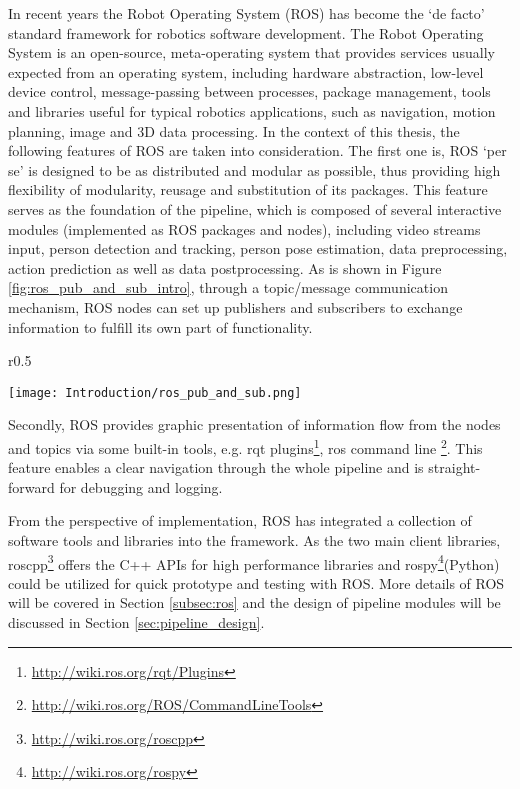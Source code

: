 In recent years the Robot Operating System (ROS) \cite{quigley2009ros} has become the ‘de facto’ standard framework for robotics software development. The Robot Operating System is an open-source, meta-operating system that provides services usually expected from an operating system, including hardware abstraction, low-level device control, message-passing between processes, package management, tools and libraries useful for typical robotics applications, such as navigation, motion planning, image and 3D data processing. In the context of this thesis, the following features of ROS are taken into consideration. The first one is, ROS ‘per se’ is designed to be as distributed and modular as possible, thus providing high flexibility of modularity, reusage and substitution of its packages. This feature serves as the foundation of the pipeline, which is composed of several interactive modules (implemented as ROS packages and nodes), including video streams input, person detection and tracking, person pose estimation, data preprocessing, action prediction as well as data postprocessing. As is shown in Figure \ref{fig:ros_pub_and_sub_intro}, through a topic/message communication mechanism, ROS nodes can set up publishers and subscribers to exchange information to fulfill its own part of functionality. 

\begin{wrapfigure}{r}{0.5\textwidth}
  \begin{center}
    \texttt{[image: Introduction/ros\_pub\_and\_sub.png]}
  \end{center}
  \caption{ROS Publisher and Subscriber}
  \label{fig:ros_pub_and_sub_intro}
\end{wrapfigure}

Secondly, ROS provides graphic presentation of information flow from the nodes and topics via some built-in tools, e.g. rqt plugins\footnote{\url{http://wiki.ros.org/rqt/Plugins}}, ros command line \footnote{\url{http://wiki.ros.org/ROS/CommandLineTools}}. This feature enables a clear navigation through the whole pipeline and is straight-forward for debugging and logging. 

From the perspective of implementation, ROS has integrated a collection of software tools and libraries into the framework. As the two main client libraries, roscpp\footnote{\url{http://wiki.ros.org/roscpp}} offers the C++ APIs for high performance libraries and rospy\footnote{\url{http://wiki.ros.org/rospy}}(Python) could be utilized for quick prototype and testing with ROS. More details of ROS will be covered in Section \ref{subsec:ros} and the design of pipeline modules will be discussed in Section \ref{sec:pipeline_design}.


